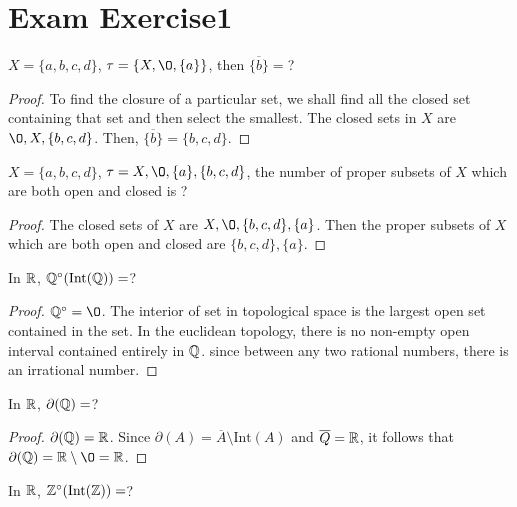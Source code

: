 \chapter{Exam Exercise1}

\begin{exercise}{}{}
    $X=\{a,b,c,d\}$, $\tau=\{X,\O,\{a\}\}$, then $\overline{\{b\}}=$?
\end{exercise}

\begin{proof}
    To  find the closure of a particular set, we shall find all the closed set containing that set and then select the smallest.
    The closed sets in $X$ are $\O,X,\{b,c,d\}$.
    Then, $\overline{\{b\}}=\{b,c,d\}$.
\end{proof}

\begin{exercise}{}{}
    $X=\{a,b,c,d\}$, $\tau={X,\O,\{a\},\{b,c,d\}}$, 
    the number of proper subsets of $X$ which are both open and closed is ?
\end{exercise}

\begin{proof}
    The closed sets of $X$ are $X,\O,\{b,c,d\},\{a\}$.
    Then the proper subsets of $X$ which are both open and closed are $\{b,c,d\},\{a\}$.
\end{proof}

\begin{exercise}{}{}
    In $\mathbb{R}$, $\mathbb{Q}^{\circ}(\text{Int}(\mathbb{Q}))=$?
\end{exercise}

\begin{proof}
    $\Q^{\circ}=\O$.
    The interior of set in topological space 
    is the largest open set contained in the set. 
    In the euclidean topology, 
    there is no non-empty open interval contained entirely in $\mathbb{Q}$.
    since between any two rational numbers, there is an irrational number.
\end{proof}

\begin{exercise}{}{}
    In $\mathbb{R}$, $\partial(\mathbb{Q})=$?
\end{exercise}

\begin{proof}
    $\partial(\mathbb{Q})=\mathbb{R}$. 
    Since $\partial(A)=\overline{A}\setminus \text{Int}(A)$ and $\overline{Q}=\mathbb{R}$,
    it follows that $\partial(\Q)=\R\setminus \O=\R$.
\end{proof}

\begin{exercise}{}{}
    In $\mathbb{R}$, $\mathbb{Z}^{\circ}(\text{Int}(\mathbb{Z}))=$?
\end{exercise}

